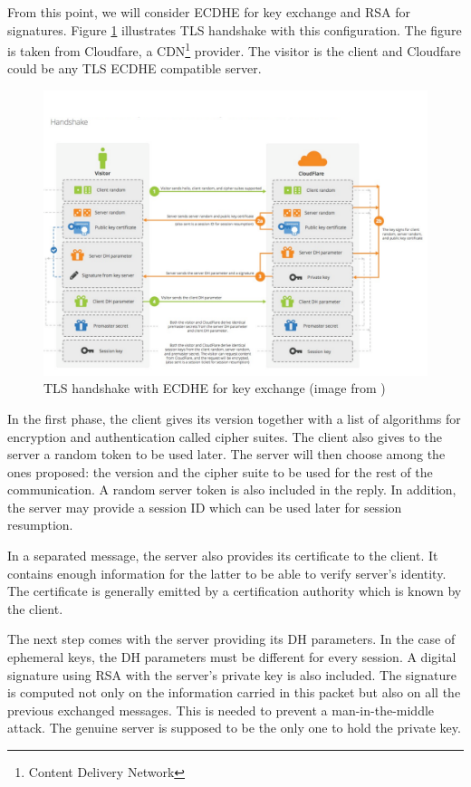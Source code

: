 From this point, we will consider ECDHE for key exchange and RSA for signatures. Figure \ref{fig:tls_handshake} illustrates TLS handshake with this configuration. The figure is taken from Cloudfare, a CDN\footnote{Content Delivery Network} provider. The visitor is the client and Cloudfare could be any TLS ECDHE compatible server. 

\begin{figure}[!ht]
\centering
\includegraphics[width=\linewidth]{images/ECDHEhandshake}
\caption[TLS handshake with ECDHE]{TLS handshake with ECDHE for key exchange (image from \cite{tlsdhhandshake})}
\label{fig:tls_handshake}
\end{figure}

In the first phase, the client gives its version together with a list of algorithms for encryption and authentication called cipher suites. The client also gives to the server a random token to be used later. The server will then choose among the ones proposed: the version and the cipher suite to be used for the rest of the communication. A random server token is also included in the reply. In addition, the server may provide a session ID which can be used later for session resumption.

In a separated message, the server also provides its certificate to the client. It contains enough information for the latter to be able to verify server's identity. The certificate is generally emitted by a certification authority which is known by the client.

The next step comes with the server providing its DH parameters. In the case of ephemeral keys, the DH parameters must be different for every session. A digital signature using RSA with the server's private key is also included. The signature is computed not only on the information carried in this packet but also on all the previous exchanged messages. This is needed to prevent a man-in-the-middle attack. The genuine server is supposed to be the only one to hold the private key.

